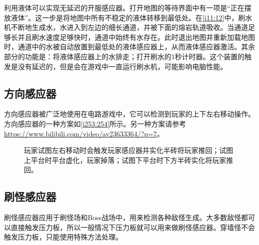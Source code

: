 利用液体可以实现无延迟的开服感应器。打开地图的等待界面中有一项是“正在摆放液体”。这一步是将地图中所有不稳定的液体转移到最低处。在\autoref{i11:12}中，刷水机不断地生成水，水进入到左边的细长通道，并被下面的熔岩轨道吸收。当通道足够长并且刷水速度足够快时，通道中始终有水存在。此时退出地图并重新加载地图时，通道中的水被自动放置到最低处的液体感应器上，从而液体感应器激活。其余部分的功能是：将液体感应器上的水排走；打开刷水的1秒计时器。这个装置的触发是没有延迟的，但是会在游戏中一直运行刷水机，可能影响电脑性能。

\subsection{方向感应器}
方向感应器被广泛地使用在电路游戏中，它可以检测到玩家的上下左右移动操作。方向感应器的一种方案如\autoref{i253:254}所示。另一种方案请参考\url{https://www.bilibili.com/video/av23633364/?p=7}。

\begin{figure}[!h]
\begin{center}
\qquad
{}
\end{center}
\caption{玩家试图左右移动时会触发玩家感应器并实化半砖将玩家推回；试图上平台时平台虚化，玩家掉落；试图下平台时下方半砖实化将玩家推回。}
\label{i253:254}
\end{figure}

\subsection{刷怪感应器}
刷怪感应器应用于刷怪场和Boss战场中，用来检测各种敌怪生成。大多数敌怪都可以直接触发压力板，所以一般情况下压力板就可以用来做刷怪感应器。穿墙怪不会触发压力板，只能使用特殊方法处理。

